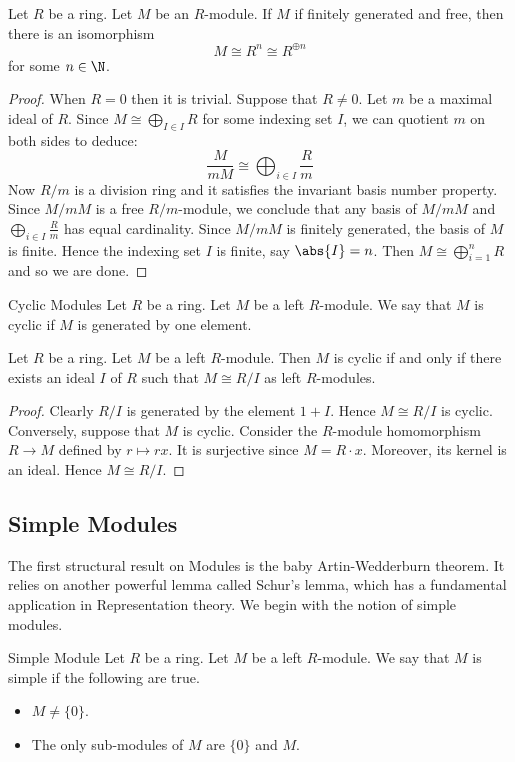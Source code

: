 \documentclass[a4paper]{article}
\begin{document}
\begin{prp}{}{} Let $R$ be a ring. Let $M$ be an $R$-module. If $M$ if finitely generated and free, then there is an isomorphism $$M\cong R^n\cong R^{\oplus n}$$ for some $n\in\N$. \tcbline
\begin{proof}
When $R=0$ then it is trivial. Suppose that $R\neq 0$. Let $m$ be a maximal ideal of $R$. Since $M\cong\bigoplus_{I\in I}R$ for some indexing set $I$, we can quotient $m$ on both sides to deduce: $$\frac{M}{mM}\cong\bigoplus_{i\in I}\frac{R}{m}$$ Now $R/m$ is a division ring and it satisfies the invariant basis number property. Since $M/mM$ is a free $R/m$-module, we conclude that any basis of $M/mM$ and $\bigoplus_{i\in I}\frac{R}{m}$ has equal cardinality. Since $M/mM$ is finitely generated, the basis of $M$ is finite. Hence the indexing set $I$ is finite, say $\abs{I}=n$. Then $M\cong\bigoplus_{i=1}^nR$ and so we are done. 
\end{proof}
\end{prp}

\begin{defn}{Cyclic Modules}{} Let $R$ be a ring. Let $M$ be a left $R$-module. We say that $M$ is cyclic if $M$ is generated by one element. 
\end{defn}

\begin{lmm}{}{} Let $R$ be a ring. Let $M$ be a left $R$-module. Then $M$ is cyclic if and only if there exists an ideal $I$ of $R$ such that $M\cong R/I$ as left $R$-modules. \tcbline
\begin{proof}
Clearly $R/I$ is generated by the element $1+I$. Hence $M\cong R/I$ is cyclic. Conversely, suppose that $M$ is cyclic. Consider the $R$-module homomorphism $R\to M$ defined by $r\mapsto rx$. It is surjective since $M=R\cdot x$. Moreover, its kernel is an ideal. Hence $M\cong R/I$. 
\end{proof}
\end{lmm}

\subsection{Simple Modules}
The first structural result on Modules is the baby Artin-Wedderburn theorem. It relies on another powerful lemma called Schur's lemma, which has a fundamental application in Representation theory. We begin with the notion of simple modules. 

\begin{defn}{Simple Module}{} Let $R$ be a ring. Let $M$ be a left $R$-module. We say that $M$ is simple if the following are true. 
\begin{itemize}
\item $M\neq\{0\}$. 
\item The only sub-modules of $M$ are $\{0\}$ and $M$. 
\end{itemize}
\end{defn}
\end{document}
